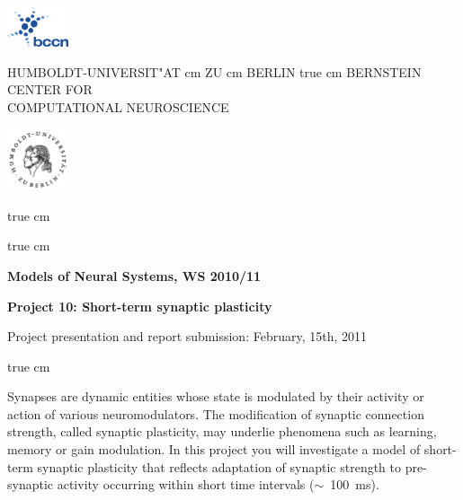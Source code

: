 \documentclass[12pt]{article}
\begin{document}
\parbox{2cm}{
\includegraphics[width=1.8cm]{../bccnlogo.pdf}
}
\parbox{11cm}{
\begin{center}
\large HUMBOLDT-UNIVERSIT"AT  cm ZU  cm BERLIN
 true cm
\mgross BERNSTEIN CENTER FOR\\ COMPUTATIONAL NEUROSCIENCE
\end{center}
}
\parbox{2cm}
{
\hfill
\includegraphics[width=1.8cm]{../hublogo.pdf}
}

 true cm



 true cm
\centerline{\bf Models of Neural Systems, WS 2010/11}
\centerline{\bf Project 10: Short-term synaptic plasticity} 
\centerline{Project presentation and report submission: February,
15th, 2011}

 true cm

Synapses are dynamic entities whose state is modulated by their
activity or action of various neuromodulators. The modification
of synaptic connection strength, called synaptic plasticity, may
underlie phenomena such as learning, memory or gain modulation. In
this project you will investigate a model of short-term synaptic plasticity that
reflects adaptation of synaptic strength to pre-synaptic activity 
occurring within short time intervals ($\sim$~100~ms).
\end{document}
